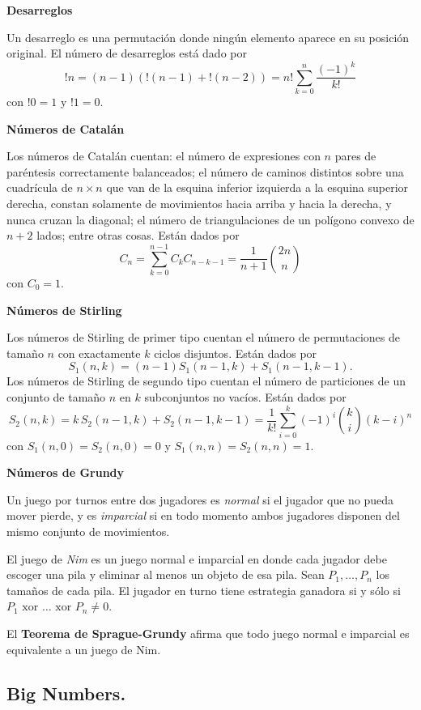 \documentclass[10pt, letterpaper, twoside]{article}
\begin{document}
\textbf{Desarreglos}

Un desarreglo es una permutación donde ningún elemento aparece en su posición original. El número de desarreglos está dado por
$$!n = (n - 1)(!(n - 1) + !(n - 2)) = n! \sum_{k=0}^n \frac{(-1)^k}{k!}$$
con $!0 = 1$ y $!1 = 0$.\medskip

\textbf{Números de Catalán}

Los números de Catalán cuentan: el número de expresiones con $n$ pares de paréntesis correctamente balanceados; el número de caminos distintos sobre una cuadrícula de $n \times n$ que van de la esquina inferior izquierda a la esquina superior derecha, constan solamente de movimientos hacia arriba y hacia la derecha, y nunca cruzan la diagonal; el número de triangulaciones de un polígono convexo de $n + 2$ lados; entre otras cosas. Están dados por
$$C_n = \sum_{k=0}^{n-1} C_kC_{n-k-1} = \frac{1}{n + 1}\binom{2n}{n}$$
con $C_0 = 1$.\medskip

\textbf{Números de Stirling}

Los números de Stirling de primer tipo cuentan el número de permutaciones de tamaño $n$ con exactamente $k$ ciclos disjuntos. Están dados por 
$$S_1(n, k) = (n - 1)S_1(n - 1, k) + S_1(n - 1, k - 1).$$
Los números de Stirling de segundo tipo cuentan el número de particiones de un conjunto de tamaño $n$ en $k$ subconjuntos no vacíos. Están dados por 
$$S_2(n, k) = k \,S_2(n - 1, k) + S_2(n - 1, k - 1) = \frac{1}{k!} \sum_{i=0}^k (-1)^i \binom{k}{i}(k - i)^n$$
con $S_1(n, 0) = S_2(n, 0) =  0$ y $S_1(n, n) = S_2(n, n) = 1$.\medskip

\textbf{Números de Grundy}

Un juego por turnos entre dos jugadores es \textit{normal} si el jugador que no pueda mover pierde, y es \textit{imparcial} si en todo momento ambos jugadores disponen del mismo conjunto de movimientos.

El juego de \textit{Nim} es un juego normal e imparcial en donde cada jugador debe escoger una pila y eliminar al menos un objeto de esa pila. Sean $P_1, \ldots, P_n$ los tamaños de cada pila. El jugador en turno tiene estrategia ganadora si y sólo si $P_1 \text{ xor } \ldots \text{ xor } P_n \neq 0$.

El \textbf{Teorema de Sprague-Grundy} afirma que todo juego normal e imparcial es equivalente a un juego de Nim.

\subsection{Big Numbers.}
\end{document}

